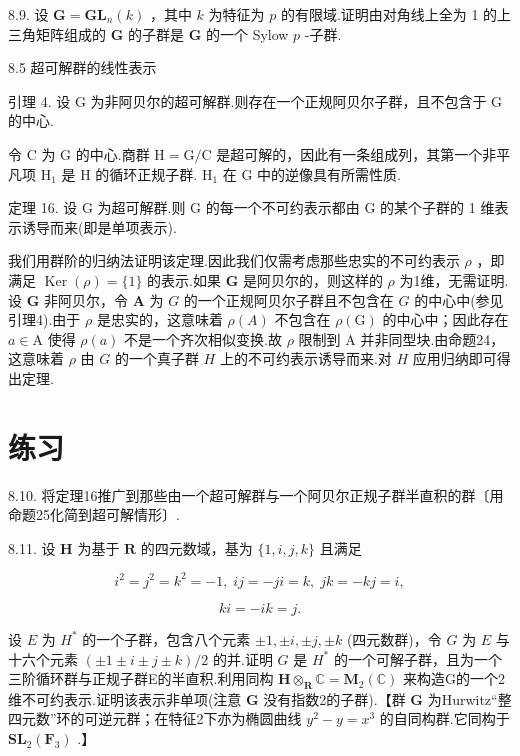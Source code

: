 \documentclass[10pt]{article}
\begin{document}
8.9. 设 \(\mathbf{G} = {\mathbf{{GL}}}_{n}\left( k\right)\) ，其中 \(k\) 为特征为 \(p\) 的有限域.证明由对角线上全为 1 的上三角矩阵组成的 \(\mathbf{G}\) 的子群是 \(\mathbf{G}\) 的一个 Sylow \(p\) -子群.

8.5 超可解群的线性表示

引理 4. 设 \(\mathrm{G}\) 为非阿贝尔的超可解群.则存在一个正规阿贝尔子群，且不包含于 \(\mathrm{G}\) 的中心.

令 \(\mathrm{C}\) 为 \(\mathrm{G}\) 的中心.商群 \(\mathrm{H} = \mathrm{G}/\mathrm{C}\) 是超可解的，因此有一条组成列，其第一个非平凡项 \({\mathrm{H}}_{1}\) 是 \(\mathrm{H}\) 的循环正规子群. \({\mathrm{H}}_{1}\) 在 \(\mathrm{G}\) 中的逆像具有所需性质.

定理 16. 设 \(\mathrm{G}\) 为超可解群.则 \(\mathrm{G}\) 的每一个不可约表示都由 \(\mathrm{G}\) 的某个子群的 1 维表示诱导而来(即是单项表示).

我们用群阶的归纳法证明该定理.因此我们仅需考虑那些忠实的不可约表示 \(\rho\) ，即满足 \(\operatorname{Ker}\left( \rho \right)  = \{ 1\}\) 的表示.如果 \(\mathbf{G}\) 是阿贝尔的，则这样的 \(\rho\) 为1维，无需证明.设 \(\mathbf{G}\) 非阿贝尔，令 \(\mathbf{A}\) 为 \(G\) 的一个正规阿贝尔子群且不包含在 \(G\) 的中心中(参见引理4).由于 \(\rho\) 是忠实的，这意味着 \(\rho \left( A\right)\) 不包含在 \(\rho \left( \mathrm{G}\right)\) 的中心中；因此存在 \(a \in  \mathrm{A}\) 使得 \(\rho \left( a\right)\) 不是一个齐次相似变换.故 \(\rho\) 限制到 \(\mathrm{A}\) 并非同型块.由命题24，这意味着 \(\rho\) 由 \(G\) 的一个真子群 \(H\) 上的不可约表示诱导而来.对 \(H\) 应用归纳即可得出定理.

\section*{练习}

8.10. 将定理16推广到那些由一个超可解群与一个阿贝尔正规子群半直积的群〔用命题25化简到超可解情形〕.

8.11. 设 \(\mathbf{H}\) 为基于 \(\mathbf{R}\) 的四元数域，基为 \(\{ 1,i,j,k\}\) 且满足

\[
{i}^{2} = {j}^{2} = {k}^{2} =  - 1,\;{ij} =  - {ji} = k,\;{jk} =  - {kj} = i,
\]

\[
{ki} =  - {ik} = j.
\]

设 \(E\) 为 \({H}^{ * }\) 的一个子群，包含八个元素 \(\pm  1, \pm  i, \pm  j, \pm  k\) (四元数群)，令 \(G\) 为 \(E\) 与十六个元素 \(\left( {\pm 1 \pm  i \pm  j \pm  k}\right) /2\) 的并.证明 \(G\) 是 \({H}^{ * }\) 的一个可解子群，且为一个三阶循环群与正规子群E的半直积.利用同构 \(\mathbf{H}{ \otimes  }_{\mathbf{R}}\mathbb{C} = {\mathbf{M}}_{2}\left( \mathbb{C}\right)\) 来构造G的一个2维不可约表示.证明该表示非单项(注意 \(\mathbf{G}\) 没有指数2的子群).【群 \(\mathbf{G}\) 为Hurwitz“整四元数”环的可逆元群；在特征2下亦为椭圆曲线 \({y}^{2} - y = {x}^{3}\) 的自同构群.它同构于 \({\mathbf{{SL}}}_{2}\left( {\mathbf{F}}_{3}\right)\) .】
\end{document}
